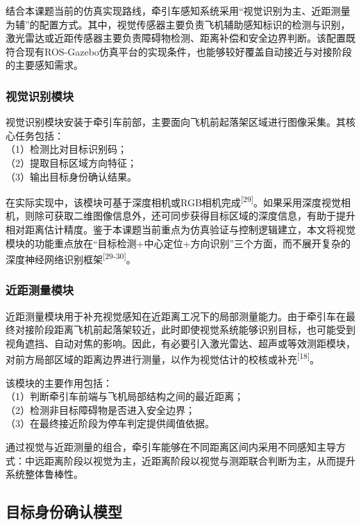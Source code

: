 \documentclass[UTF8,a4paper,12pt]{ctexart}
\begin{document}
结合本课题当前的仿真实现路线，牵引车感知系统采用``视觉识别为主、近距测量为辅''的配置方式。其中，视觉传感器主要负责飞机辅助感知标识的检测与识别，激光雷达或近距传感器主要负责障碍物检测、距离补偿和安全边界判断。该配置既符合现有ROS-Gazebo仿真平台的实现条件，也能够较好覆盖自动接近与对接阶段的主要感知需求。

\subsubsection{视觉识别模块}\label{_Toc228997187}

视觉识别模块安装于牵引车前部，主要面向飞机前起落架区域进行图像采集。其核心任务包括：\\
（1）检测比对目标识别码；\\
（2）提取目标区域方向特征；\\
（3）输出目标身份确认结果。

在实际实现中，该模块可基于深度相机或RGB相机完成\textsuperscript{[29]}。如果采用深度视觉相机，则除可获取二维图像信息外，还可同步获得目标区域的深度信息，有助于提升相对距离估计精度。鉴于本课题当前重点为仿真验证与控制逻辑建立，本文将视觉模块的功能重点放在``目标检测+中心定位+方向识别''三个方面，而不展开复杂的深度神经网络识别框架\textsuperscript{[29-30]}。

\subsubsection{近距测量模块}\label{_Toc228997188}

近距测量模块用于补充视觉感知在近距离工况下的局部测量能力。由于牵引车在最终对接阶段距离飞机前起落架较近，此时即使视觉系统能够识别目标，也可能受到视角遮挡、自动对焦的影响。因此，有必要引入激光雷达、超声或等效测距模块，对前方局部区域的距离边界进行测量，以作为视觉估计的校核或补充\textsuperscript{[18]}。

该模块的主要作用包括：\\
（1）判断牵引车前端与飞机局部结构之间的最近距离；\\
（2）检测非目标障碍物是否进入安全边界；\\
（3）在最终接近阶段为停车判定提供阈值依据。

通过视觉与近距测量的组合，牵引车能够在不同距离区间内采用不同感知主导方式：中远距离阶段以视觉为主，近距离阶段以视觉与测距联合判断为主，从而提升系统整体鲁棒性。

\subsection{目标身份确认模型}\label{_Toc228997189}
\end{document}
